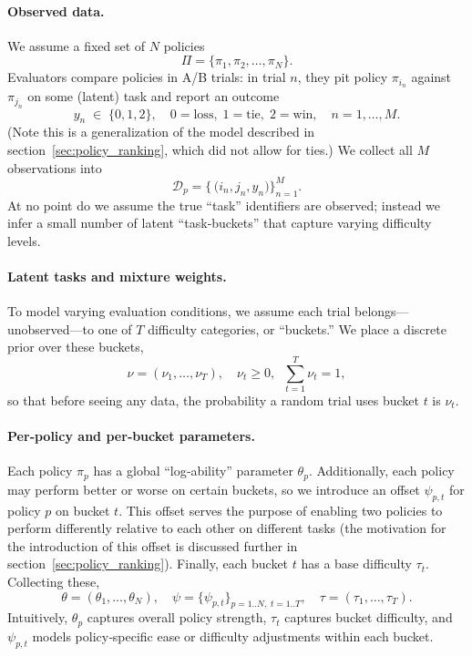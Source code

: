 \paragraph{Observed data.}  
We assume a fixed set of \(N\) policies
\[
  \Pi = \{\pi_1,\pi_2,\dots,\pi_N\}.
\]
Evaluators compare policies in A/B trials: in trial \(n\), they pit policy
\(\pi_{i_n}\) against \(\pi_{j_n}\) on some (latent) task and report an outcome
\[
  y_n \;\in\;\{0,1,2\},
  \quad
  0=\text{loss},\;1=\text{tie},\;2=\text{win},
  \quad
  n=1,\dots,M.
\]
(Note this is a generalization of the model described in section~\ref{sec:policy_ranking}, which did not allow for ties.) We collect all \(M\) observations into
\[
  \mathcal{D}_p
  =\bigl\{\,\bigl(i_n,j_n,y_n\bigr)\bigr\}_{n=1}^M.
\]
At no point do we assume the true “task” identifiers are observed; instead we infer a small number of latent “task‐buckets” that capture varying difficulty levels.

\paragraph{Latent tasks and mixture weights.}  
To model varying evaluation conditions, we assume each trial belongs—unobserved—to one of \(T\) difficulty categories, or “buckets.”  We place a discrete prior over these buckets,
\[
  \nu = (\nu_1,\dots,\nu_T),
  \quad
  \nu_t \ge 0,\;\;\sum_{t=1}^T \nu_t = 1,
\]
so that before seeing any data, the probability a random trial uses bucket \(t\) is \(\nu_t\).

\paragraph{Per‐policy and per‐bucket parameters.}  
Each policy \(\pi_p\) has a global “log‐ability” parameter \(\theta_p\).  Additionally, each policy may perform better or worse on certain buckets, so we introduce an offset \(\psi_{p,t}\) for policy \(p\) on bucket \(t\). This offset serves the purpose of enabling two policies to perform differently relative to each other on different tasks (the motivation for the introduction of this offset is discussed further in section~\ref{sec:policy_ranking}). Finally, each bucket \(t\) has a base difficulty \(\tau_t\).  Collecting these,
\[
  \theta = (\theta_1,\dots,\theta_N),\quad
  \psi = \{\psi_{p,t}\}_{p=1..N,\;t=1..T},\quad
  \tau = (\tau_1,\dots,\tau_T).
\]
Intuitively, \(\theta_p\) captures overall policy strength, \(\tau_t\) captures bucket difficulty, and \(\psi_{p,t}\) models policy‐specific ease or difficulty adjustments within each bucket.

